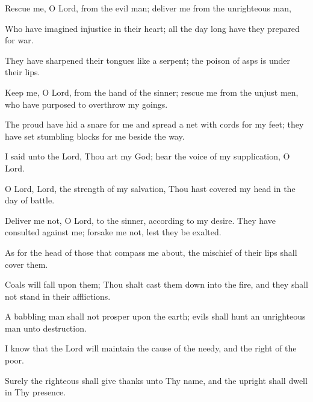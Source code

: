 Rescue me, O Lord, from the evil man; deliver me from the unrighteous man,

Who have imagined injustice in their heart; all the day long have they prepared for war.

They have sharpened their tongues like a serpent; the poison of asps is under their lips.

Keep me, O Lord, from the hand of the sinner; rescue me from the unjust men, who have purposed to overthrow my goings.

The proud have hid a snare for me and spread a net with cords for my feet; they have set stumbling blocks for me beside the way.

I said unto the Lord, Thou art my God; hear the voice of my supplication, O Lord.

O Lord, Lord, the strength of my salvation, Thou hast covered my head in the day of battle.

Deliver me not, O Lord, to the sinner, according to my desire. They have consulted against me; forsake me not, lest they be exalted.

As for the head of those that compass me about, the mischief of their lips shall cover them.

Coals will fall upon them; Thou shalt cast them down into the fire, and they shall not stand in their afflictions.

A babbling man shall not prosper upon the earth; evils shall hunt an unrighteous man unto destruction.

I know that the Lord will maintain the cause of the needy, and the right of the poor.

Surely the righteous shall give thanks unto Thy name, and the upright shall dwell in Thy presence.
